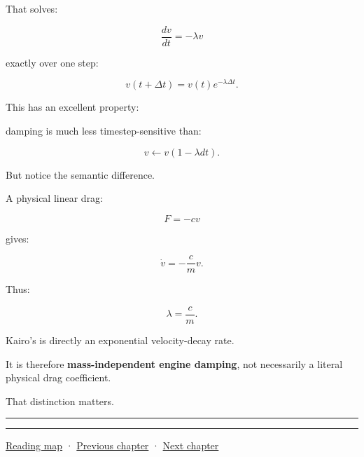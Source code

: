 That solves:

\[
\frac{dv}{dt}
=
-\lambda v
\]

exactly over one step:

\[
\boxed{
v(t+\Delta t)
=
v(t)e^{-\lambda\Delta t}.
}
\]

This has an excellent property:

damping is much less timestep-sensitive than:

\[
v\leftarrow v(1-\lambda dt).
\]

But notice the semantic difference.

A physical linear drag:

\[
F=-cv
\]

gives:

\[
\dot v
=
-\frac{c}{m}v.
\]

Thus:

\[
\lambda
=
\frac{c}{m}.
\]

Kairo's  is directly an exponential velocity-decay rate.

It is therefore \textbf{mass-independent engine damping}, not necessarily a literal physical drag coefficient.

That distinction matters.

\begin{center}\rule{0.5\linewidth}{0.5pt}\end{center}

\begin{center}\rule{0.5\linewidth}{0.5pt}\end{center}

\hyperref[volume-reading-map]{Reading map} · \hyperref[06-engine-ii-ch033-versioned-scenes-and-transactional-loading]{Previous chapter} · \hyperref[06-engine-ii-ch035-a-complete-rigid-body-state-before-the-formula-audit]{Next chapter}

